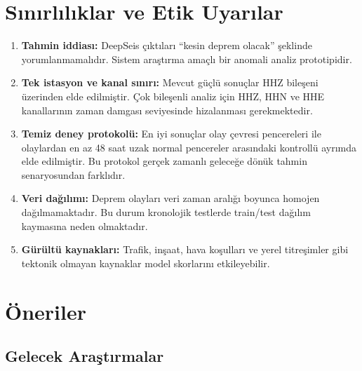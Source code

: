 \section{Sınırlılıklar ve Etik Uyarılar}

\begin{enumerate}
    \item \textbf{Tahmin iddiası:} DeepSeis çıktıları ``kesin deprem olacak'' şeklinde yorumlanmamalıdır. Sistem araştırma amaçlı bir anomali analiz prototipidir.
    
    \item \textbf{Tek istasyon ve kanal sınırı:} Mevcut güçlü sonuçlar HHZ bileşeni üzerinden elde edilmiştir. Çok bileşenli analiz için HHZ, HHN ve HHE kanallarının zaman damgası seviyesinde hizalanması gerekmektedir.
    
    \item \textbf{Temiz deney protokolü:} En iyi sonuçlar olay çevresi pencereleri ile olaylardan en az 48 saat uzak normal pencereler arasındaki kontrollü ayrımda elde edilmiştir. Bu protokol gerçek zamanlı geleceğe dönük tahmin senaryosundan farklıdır.
    
    \item \textbf{Veri dağılımı:} Deprem olayları veri zaman aralığı boyunca homojen dağılmamaktadır. Bu durum kronolojik testlerde train/test dağılım kaymasına neden olmaktadır.
    
    \item \textbf{Gürültü kaynakları:} Trafik, inşaat, hava koşulları ve yerel titreşimler gibi tektonik olmayan kaynaklar model skorlarını etkileyebilir.
\end{enumerate}

\section{Öneriler}

\subsection{Gelecek Araştırmalar}

